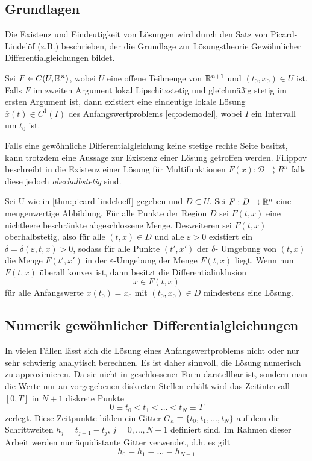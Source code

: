 \subsection{Grundlagen}
Die Existenz und Eindeutigkeit von Lösungen wird durch den Satz von Picard-Lindelöf (z.B.\cite{teschl2012ordinary}) beschrieben, der die Grundlage zur Lösungstheorie Gewöhnlicher Differentialgleichungen bildet.
\begin{theorem}
\label{thm:picard-lindeloeff}
 Sei $F\in C(U,\mathbb{R}^n)$, wobei $U$ eine offene Teilmenge von $\mathbb{R}^{n+1}$ und $(t_0,x_0)\in U$ ist. Falls $F$ im zweiten Argument lokal Lipschitzstetig und gleichmäßig stetig im ersten Argument ist, dann existiert eine eindeutige lokale Lösung $\bar x(t)\in C^1(I)$ des Anfangswertproblems \eqref{eq:odemodel}, wobei $I$ ein Intervall um $t_0$ ist.
\end{theorem}
% 


Falls eine gewöhnliche Differentialgleichung keine stetige rechte Seite besitzt, kann trotzdem eine Aussage zur Existenz einer Lösung getroffen werden. Filippov beschreibt in \cite{filippov1971existence} die Existenz einer Lösung für Multifunktionen $F(x):\mathcal D \rightrightarrows R^n$ falls diese jedoch \textit{oberhalbstetig} sind. 
\begin{theorem}[Filippov]
 Sei U wie in \ref{thm:picard-lindeloeff} gegeben und $D\subset U$. Sei $F:D\rightrightarrows \mathbb{R}^n$ eine mengenwertige Abbildung. Für alle Punkte der Region $D$ sei $F(t,x)$ eine nichtleere beschränkte abgeschlossene Menge. Desweiteren sei $F(t,x)$ oberhalbstetig, also für alle $(t,x)\in D$ und alle $\varepsilon>0$ existiert ein $\delta = \delta(\varepsilon,t,x)>0$, sodass für alle Punkte $(t',x')$ der $\delta$- Umgebung von $(t,x)$ die Menge $F(t',x')$ in der $\varepsilon$-Umgebung der Menge $F(t,x)$ liegt.
 Wenn nun $F(t,x)$ überall konvex ist, dann besitzt die Differentialinklusion
 \[
  \dot x \in F(t,x)
 \]
 für alle Anfangswerte $x(t_0)=x_0$ mit $(t_0,x_0)\in D$ mindestens eine Lösung.
\end{theorem}


\subsection{Numerik gewöhnlicher Differentialgleichungen}
In vielen Fällen lässt sich die Lösung eines Anfangswertproblems nicht oder nur sehr schwierig analytisch berechnen. Es ist daher sinnvoll, die Lösung numerisch zu approximieren. Da sie nicht in geschlossener Form darstellbar ist, sondern man die Werte nur an vorgegebenen diskreten Stellen erhält wird das Zeitintervall $[0,T]$ in $N+1$ diskrete Punkte
\[
 0\equiv t_0<t_1<\ldots < t_N \equiv T
\]
zerlegt. Diese Zeitpunkte bilden ein Gitter $G_h \equiv \lbrace t_0,t_1,\ldots, t_N\rbrace $ auf dem die Schrittweiten $h_j= t_{j+1}-t_j$, $j=0,\ldots, N-1$ definiert sind. Im Rahmen dieser Arbeit werden nur äquidistante Gitter verwendet, d.h. es gilt 
\[
h_0=h_1 = \ldots = h_{N-1} 
\]
 
